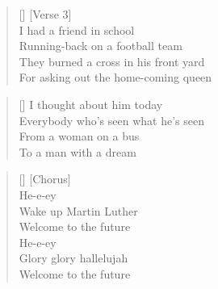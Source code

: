 \documentclass{report}
\begin{document}
\begin{verse}[\versewidth]
[Verse 3]\\
I had a friend in school\\
Running-back on a football team\\
They burned a cross in his front yard\\
For asking out the home-coming queen\\
\end{verse}
\begin{verse}[\versewidth]
I thought about him today\\
Everybody who's seen what he's seen\\
From a woman on a bus\\
To a man with a dream\\
\end{verse}
\begin{verse}[\versewidth]
[Chorus]\\
He-e-ey\\
Wake up Martin Luther\\
Welcome to the future\\
He-e-ey\\
Glory glory hallelujah\\
Welcome to the future\\
\end{verse}
\end{document}
